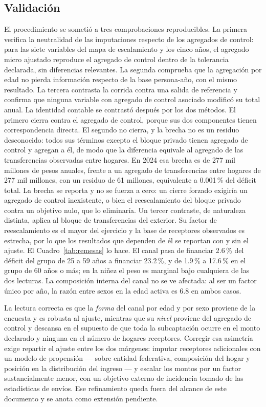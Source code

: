 \documentclass[11pt,a4paper]{article}
\begin{document}
\subsection{Validación}
\label{sec:validacion}
El procedimiento se sometió a tres comprobaciones reproducibles. La primera verifica la
neutralidad de las imputaciones respecto de los agregados de control: para las siete variables
del mapa de escalamiento y los cinco años, el agregado micro ajustado reproduce el agregado de
control dentro de la tolerancia declarada, sin diferencias relevantes. La segunda comprueba que
la agregación por edad no pierda información respecto de la base persona-año, con el mismo
resultado. La tercera contrasta la corrida contra una salida de referencia y confirma que
ninguna variable con agregado de control asociado modificó su total anual.
La identidad contable se contrastó después por los dos métodos. El primero cierra contra el
agregado de control, porque sus dos componentes tienen correspondencia directa. El segundo no
cierra, y la brecha no es un residuo desconocido: todos sus términos excepto el bloque privado
tienen agregado de control y agregan a él, de modo que la diferencia equivale al agregado de las
transferencias observadas entre hogares. En 2024 esa brecha es de 277 mil millones de pesos
anuales, frente a un agregado de transferencias entre hogares de 277 mil millones, con un residuo
de 61 millones, equivalente a 0.001\,\% del déficit total. La brecha se reporta y no se fuerza a
cero: un cierre forzado exigiría un agregado de control inexistente, o bien el reescalamiento del
bloque privado contra un objetivo nulo, que lo eliminaría.
Un tercer contraste, de naturaleza distinta, aplica al bloque de transferencias del exterior. Su
factor de reescalamiento es el mayor del ejercicio y la base de receptores observados es estrecha,
por lo que los resultados que dependen de él se reportan con y sin el ajuste. El
Cuadro~\ref{tab:remesas} lo hace. El canal pasa de financiar 2.6\,\% del déficit del grupo de 25
a 59 años a financiar 23.2\,\%, y de 1.9\,\% a 17.6\,\% en el grupo de 60 años o más; en la
niñez el peso es marginal bajo cualquiera de las dos lecturas. La composición interna del canal no
se ve afectada: al ser un factor único por año, la razón entre sexos en la edad activa es 6.8 en
ambos casos.

La lectura correcta es que la \emph{forma} del canal por edad y por sexo proviene de la encuesta y
es robusta al ajuste, mientras que su \emph{nivel} proviene del agregado de control y descansa en
el supuesto de que toda la subcaptación ocurre en el monto declarado y ninguna en el número de
hogares receptores. Corregir esa asimetría exige repartir el ajuste entre los dos márgenes: imputar
receptores adicionales con un modelo de propensión --- sobre entidad federativa, composición del
hogar y posición en la distribución del ingreso --- y escalar los montos por un factor
sustancialmente menor, con un objetivo externo de incidencia tomado de las estadísticas de envíos.
Ese refinamiento queda fuera del alcance de este documento y se anota como extensión pendiente.
\end{document}
